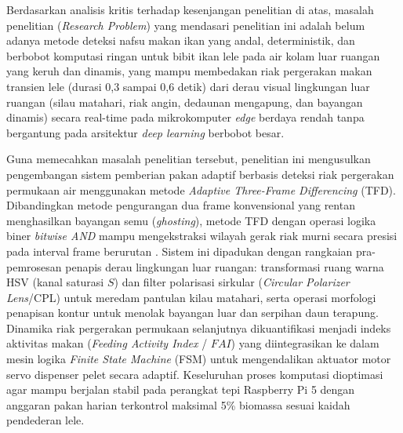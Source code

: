 Berdasarkan analisis kritis terhadap kesenjangan penelitian di atas, masalah penelitian (\textit{Research Problem}) yang mendasari penelitian ini adalah belum adanya metode deteksi nafsu makan ikan yang andal, deterministik, dan berbobot komputasi ringan untuk bibit ikan lele pada air kolam luar ruangan yang keruh dan dinamis, yang mampu membedakan riak pergerakan makan transien lele (durasi 0,3 sampai 0,6 detik) dari derau visual lingkungan luar ruangan (silau matahari, riak angin, dedaunan mengapung, dan bayangan dinamis) secara real-time pada mikrokomputer \textit{edge} berdaya rendah tanpa bergantung pada arsitektur \textit{deep learning} berbobot besar.

Guna memecahkan masalah penelitian tersebut, penelitian ini mengusulkan pengembangan sistem pemberian pakan adaptif berbasis deteksi riak pergerakan permukaan air menggunakan metode \textit{Adaptive Three-Frame Differencing} (TFD). Dibandingkan metode pengurangan dua frame konvensional yang rentan menghasilkan bayangan semu (\textit{ghosting}), metode TFD dengan operasi logika biner \textit{bitwise AND} mampu mengekstraksi wilayah gerak riak murni secara presisi pada interval frame berurutan \cite{Atoum2015}. Sistem ini dipadukan dengan rangkaian pra-pemrosesan penapis derau lingkungan luar ruangan: transformasi ruang warna HSV (kanal saturasi $S$) dan filter polarisasi sirkular (\textit{Circular Polarizer Lens}/CPL) untuk meredam pantulan kilau matahari, serta operasi morfologi penapisan kontur untuk menolak bayangan luar dan serpihan daun terapung. Dinamika riak pergerakan permukaan selanjutnya dikuantifikasi menjadi indeks aktivitas makan (\textit{Feeding Activity Index} / $FAI$) yang diintegrasikan ke dalam mesin logika \textit{Finite State Machine} (FSM) untuk mengendalikan aktuator motor servo dispenser pelet secara adaptif. Keseluruhan proses komputasi dioptimasi agar mampu berjalan stabil pada perangkat tepi Raspberry Pi 5 dengan anggaran pakan harian terkontrol maksimal 5\% biomassa sesuai kaidah pendederan lele.

